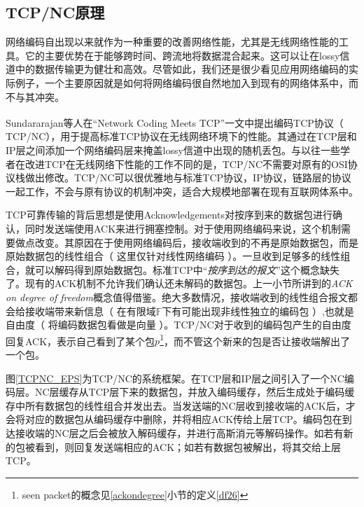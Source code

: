 \subsection{TCP/NC原理}
\par
网络编码自出现以来就作为一种重要的改善网络性能，尤其是无线网络性能的工具。它的主要优势在于能够跨时间、跨流地将数据混合起来。这可以让在lossy信道中的数据传输更为健壮和高效。尽管如此，我们还是很少看见应用网络编码的实际例子，一个主要原因就是如何将网络编码很自然地加入到现有的网络体系中，而不与其冲突。
\par
Sundararajan等人在“Network Coding Meets TCP”\textsuperscript{\cite{Sundararajan2009}}一文中提出编码TCP协议（ TCP/NC），用于提高标准TCP协议在无线网络环境下的性能。其通过在TCP层和IP层之间添加一个网络编码层来掩盖lossy信道中出现的随机丢包。与以往一些学者在改进TCP在无线网络下性能的工作不同的是，TCP/NC不需要对原有的OSI协议栈做出修改。TCP/NC可以很优雅地与标准TCP协议，IP协议，链路层的协议一起工作，不会与原有协议的机制冲突，适合大规模地部署在现有互联网体系中。
\par
TCP可靠传输的背后思想是使用Acknowledgements对按序到来的数据包进行确认，同时发送端使用ACK来进行拥塞控制。对于使用网络编码来说，这个机制需要做点改变。其原因在于使用网络编码后，接收端收到的不再是原始数据包，而是原始数据包的线性组合（ 这里仅针对线性网络编码 ）。一旦收到足够多的线性组合，就可以解码得到原始数据包。标准TCP中“\emph{按序到达的报文}”这个概念缺失了。现有的ACK机制不允许我们确认还未解码的数据包。上一小节所讲到的\emph{ACK on degree of freedom}概念值得借鉴。绝大多数情况，接收端收到的线性组合报文都会给接收端带来新信息（ 在有限域$\mathbb{F}$下有可能出现非线性独立的编码包 ）,也就是自由度（ 将编码数据包看做是向量 ）。TCP/NC对于收到的编码包产生的自由度回复ACK，表示自己看到了某个包$p$\footnote{seen packet的概念见\ref{ackondegree}小节的定义\ref{df26}}，而不管这个新来的包是否让接收端解出了一个包。
\par
图\ref{TCPNC_EPS}为TCP/NC的系统框架。在TCP层和IP层之间引入了一个NC编码层。NC层缓存从TCP层下来的数据包，并放入编码缓存，然后生成处于编码缓存中所有数据包的线性组合并发出去。当发送端的NC层收到接收端的ACK后，才会将对应的数据包从编码缓存中删除，并将相应ACK传给上层TCP。编码包在到达接收端的NC层之后会被放入解码缓存，并进行高斯消元等解码操作。如若有新的包被看到，则回复发送端相应的ACK；如若有数据包被解出，将其交给上层TCP。
